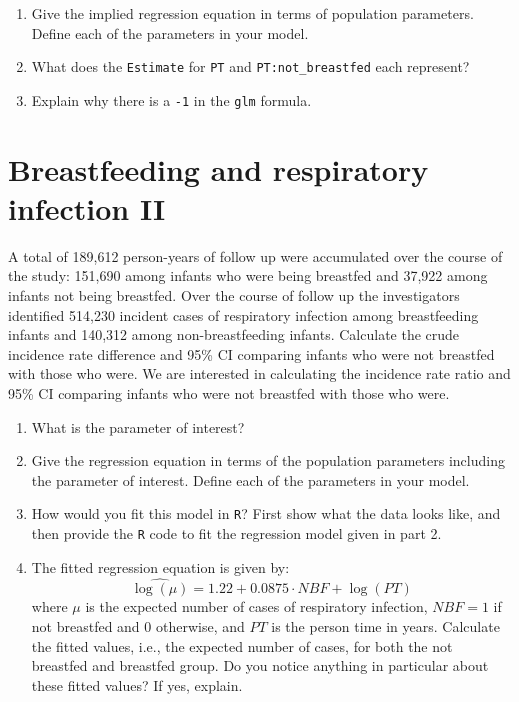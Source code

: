 \documentclass[landscape,twocolumn,letterpaper,9pt,reqno]{article}\usepackage[]{graphicx}\usepackage[]{color}
\newcommand{\compresslist}{ %
	\setlength{\itemsep}{1pt}
	\setlength{\parskip}{0pt}
	\setlength{\parsep}{0pt}
}
\begin{document}
\begin{enumerate}\compresslist
	\item Give the implied regression equation in terms of population parameters. Define each of the parameters in your model.
	\item What does the \texttt{Estimate} for \texttt{PT} and \texttt{PT:not\_breastfed} each represent? 
	\item Explain why there is a \texttt{-1} in the \texttt{glm} formula.
\end{enumerate}



\clearpage




\section{Breastfeeding and respiratory infection II}

A total of 189,612 person-years of follow up were accumulated over the course of the study: 151,690
among infants who were being breastfed and 37,922 among infants not being breastfed. Over the
course of follow up the investigators identified 514,230 incident cases of respiratory infection among
breastfeeding infants and 140,312 among non-breastfeeding infants. Calculate the crude incidence rate difference and 95\% CI comparing infants who were not breastfed with those who were. We are interested in calculating the incidence rate ratio and 95\% CI comparing infants who were not breastfed with those who were.




\begin{enumerate}\compresslist
	\item What is the parameter of interest?
	\item Give the regression equation in terms of the population parameters including the parameter of interest. Define each of the parameters in your model.
	\item How would you fit this model in \texttt{R}? First show what the data looks like, and then provide the \texttt{R} code to fit the regression model given in part 2.
	\item The fitted regression equation is given by: \[ \widehat{\log(\mu)} = 1.22 + 0.0875 \cdot NBF + \log(PT) \] where $\mu$ is the expected number of cases of respiratory infection, $NBF=1$ if not breastfed and 0 otherwise, and $PT$ is the person time in years. Calculate the fitted values, i.e., the expected number of cases, for both the not breastfed and breastfed group. Do you notice anything in particular about these fitted values? If yes, explain. 
\end{enumerate}
\end{document}
